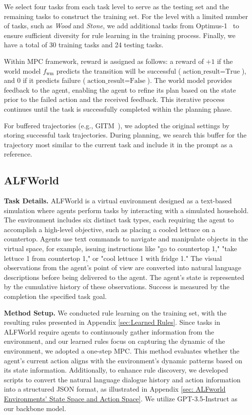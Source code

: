 \documentclass{article} %
\begin{document}
We select four tasks from each task level to serve as the testing set and the remaining tasks to construct the training set. For the level with a limited number of tasks, such as \textit{Wood} and \textit{Stone}, we add additional tasks from Optimus-1~\citep{li2024optimus} to ensure sufficient diversity for rule learning in the training process. Finally, we have a total of 30 training tasks and 24 testing tasks. 


Within MPC framework, reward is assigned as follows: a reward of $+1$ if the world model $f_{\text{wm}}$ predicts the transition will be successful ($\text{action\_result}=\text{True}$), and $0$ if it predicts failure ($\text{action\_result}=\text{False}$). The world model provides feedback to the agent, enabling the agent to refine its plan based on the state prior to the failed action and the received feedback. This iterative process continues until the task is successfully completed within the planning phase.

For buffered trajectories (e.g., GITM~\citep{zhu2023ghost}), we adopted the original settings by storing successful task trajectories. During planning, we search this buffer for the trajectory most similar to the current task and include it in the prompt as a reference.





\subsection{ALFWorld}
\label{sec:ALFWorld Experiment Details}

\textbf{Task Details.} ALFWorld is a virtual environment designed as a text-based simulation where agents perform tasks by interacting with a simulated household. The environment includes six distinct task types, each requiring the agent to accomplish a high-level objective, such as placing a cooled lettuce on a countertop. Agents use text commands to navigate and manipulate objects in the virtual space, for example, issuing instructions like "go to countertop 1," "take lettuce 1 from countertop 1," or "cool lettuce 1 with fridge 1." The visual observations from the agent’s point of view are converted into natural language descriptions before being delivered to the agent. The agent's state is represented by the cumulative history of these observations. Success is measured by the completion the specified task goal.

\textbf{Method Setup.} 
We conducted rule learning on the training set, with the resulting rules presented in Appendix \ref{sec:Learned Rules}. 
Since tasks in ALFWorld require agents to continuously gather information from the environment, and our learned rules focus on capturing the dynamic of the environment, we adopted a one-step MPC. This method evaluates whether the agent's current action aligns with the environment's dynamic patterns based on its state information.
Additionally, to enhance rule discovery, we developed scripts to convert the natural language dialogue history and action information into a structured JSON format, as illustrated in Appendix \ref{sec: ALFworld Environments' State Space and Action Space}. 
We utilize GPT-3.5-Instruct as our backbone model. 
\end{document}
